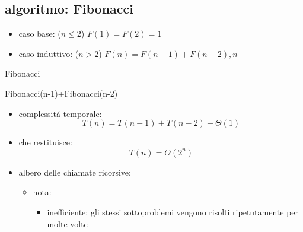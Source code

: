\subsection*{algoritmo: Fibonacci}
\begin{flushleft}
	\begin{itemize}
		\item caso base: ($n\leq 2$) $F(1)=F(2)=1$
		\item caso induttivo: ($n>2$) $F(n)=F(n-1)+F(n-2),n$
	\end{itemize}
	\begin{algorithm}
		\caption{Fibonacci}
		\begin{algorithmic}
			\ELSE
				\RETURN Fibonacci(n-1)+Fibonacci(n-2)
			\ENDIF
		\end{algorithmic}
	\end{algorithm}
	\begin{itemize}
		\item complessit\'a temporale:
			$$T(n)=T(n-1)+T(n-2)+\Theta(1)$$
		\item che restituisce:
			$$T(n)=O(2^n)$$
		\item albero delle chiamate ricorsive:
		\begin{itemize}
			\item nota:
			\begin{itemize}
				\item inefficiente: gli stessi sottoproblemi vengono risolti ripetutamente per molte volte
			\end{itemize}
		\end{itemize}
	\end{itemize}
\end{flushleft}


